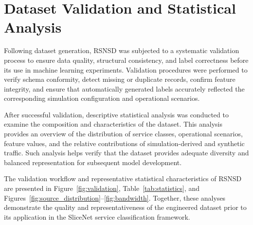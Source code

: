 \documentclass[12pt,a4paper]{report}
\begin{document}
	
	
	\section{Dataset Validation and Statistical Analysis}
	\label{sec:validation}
	
	Following dataset generation, RSNSD was subjected to a systematic validation process to ensure data quality, structural consistency, and label correctness before its use in machine learning experiments. Validation procedures were performed to verify schema conformity, detect missing or duplicate records, confirm feature integrity, and ensure that automatically generated labels accurately reflected the corresponding simulation configuration and operational scenarios.
	
	After successful validation, descriptive statistical analysis was conducted to examine the composition and characteristics of the dataset. This analysis provides an overview of the distribution of service classes, operational scenarios, feature values, and the relative contributions of simulation-derived and synthetic traffic. Such analysis helps verify that the dataset provides adequate diversity and balanced representation for subsequent model development.
	
	The validation workflow and representative statistical characteristics of RSNSD are presented in Figure~\ref{fig:validation}, Table~\ref{tab:statistics}, and Figures~\ref{fig:source_distribution}--\ref{fig:bandwidth}. Together, these analyses demonstrate the quality and representativeness of the engineered dataset prior to its application in the SliceNet service classification framework.
	
\end{document}
